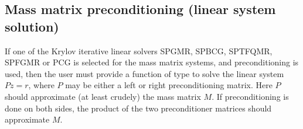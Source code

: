 \documentclass[letterpaper,10pt,english]{sphinxmanual}
\begin{document}
\subsection{Mass matrix preconditioning (linear system solution)}
\label{c_interface/User_supplied:cinterface-massprecsolvefn}\label{c_interface/User_supplied:mass-matrix-preconditioning-linear-system-solution}
If one of the Krylov iterative linear solvers SPGMR, SPBCG, SPTFQMR,
SPFGMR or PCG is selected for the mass matrix systems, and
preconditioning is used, then the user must provide a function of type
{\hyperref[c_interface/User_supplied:ARKSpilsMassPrecSolveFn]{}} to solve the linear system
$Pz=r$, where $P$ may be either a left or right
preconditioning matrix.  Here $P$ should approximate (at least
crudely) the mass matrix $M$.  If preconditioning is done on
both sides, the product of the two preconditioner matrices should
approximate $M$.
\end{document}
